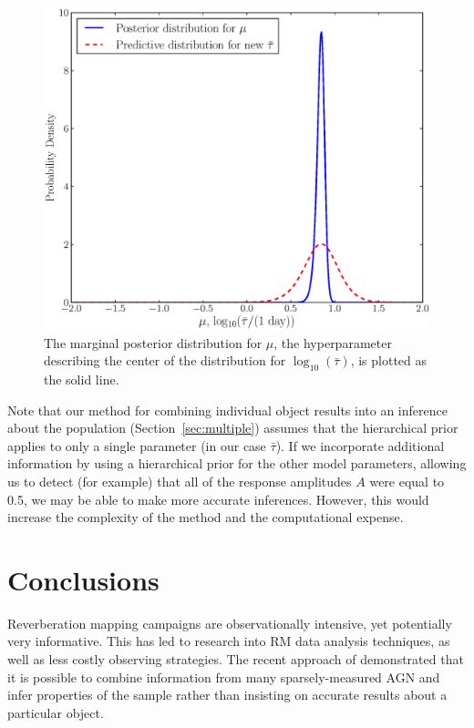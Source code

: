 \documentclass[useAMS,usenatbib]{mn2e}
\begin{document}
\begin{figure}
\begin{center}
\includegraphics[scale=0.35]{Figures/posterior2.eps}
\caption{The marginal posterior distribution for $\mu$, the 
hyperparameter describing the center of the distribution for
$\log_{10}\left(\bar{\tau}\right)$, is plotted as the solid line.
\label{fig:posterior2}}
\end{center}
\end{figure}

Note that our method for combining individual object results into an inference
about the population (Section~\ref{sec:multiple}) assumes that the hierarchical
prior applies to only a single parameter (in our case $\bar{\tau}$). If we
incorporate additional information by using a hierarchical prior for the other
model parameters, allowing us to detect (for example) that all of the response
amplitudes $A$ were equal to 0.5, we may be able to make more accurate
inferences. However, this would increase the complexity of the method and the
computational expense.

\section{Conclusions}\label{sec:conclusions}
Reverberation mapping campaigns are observationally intensive, yet potentially
very informative. This has led to
research into RM data analysis techniques, as well as less costly observing
strategies. The recent approach of \citet{2012MNRAS.427.2701F} demonstrated
that it is possible to combine information from many sparsely-measured AGN
and infer properties of the sample rather than insisting on accurate results
about a particular object.
\end{document}
